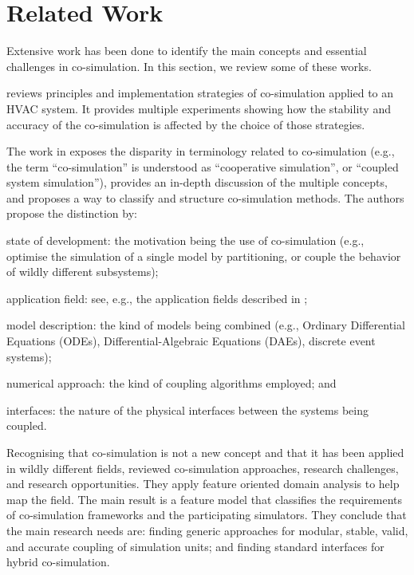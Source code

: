 
\section{Related Work}\label{sec:related}

Extensive work has been done to identify the main concepts and essential challenges in co-simulation.
In this section, we review some of these works.

\cite{Trcka2007} reviews principles and implementation strategies of co-simulation applied to an HVAC system.
It provides multiple experiments showing how the stability and accuracy of the co-simulation is affected by the choice of those strategies.

The work in \cite{Hafner2017} exposes the disparity in terminology related to co-simulation (e.g., the term ``co-simulation'' is understood as ``cooperative simulation'', or ``coupled system simulation''), provides an in-depth discussion of the multiple concepts, and proposes a way to classify and structure co-simulation methods.
The authors propose the distinction by:
\begin{compactdesc}
\item[state of development:] the motivation being the use of co-simulation (e.g., optimise the simulation of a single model by partitioning, or couple the behavior of wildly different subsystems);
\item[application field:] see, e.g., the application fields described in \cite{Gomes2017};
\item[model description:]  the kind of models being combined (e.g., Ordinary Differential Equations (ODEs), Differential-Algebraic Equations (DAEs), discrete event systems);
\item[numerical approach:] the kind of coupling algorithms employed; and
\item[interfaces:]  the nature of the physical interfaces between the systems being coupled.
\end{compactdesc}

Recognising that co-simulation is not a new concept and that it has been applied in wildly different fields, \cite{Gomes2018} reviewed co-simulation approaches, research challenges, and research opportunities.
They apply feature oriented domain analysis \cite{Kang1990} to help map the field.
The main result is a feature model that classifies the requirements of co-simulation frameworks and the participating simulators.
They conclude that the main research needs are: finding generic approaches for modular, stable, valid, and accurate coupling of simulation units; and finding standard interfaces for hybrid co-simulation.

